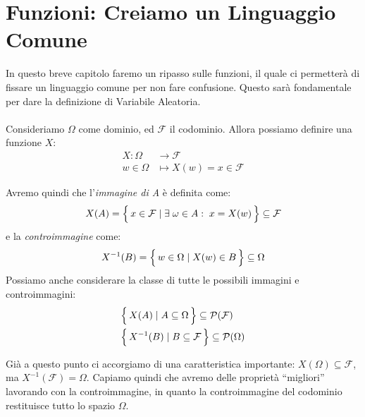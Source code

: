 \chapter{Funzioni: Creiamo un Linguaggio Comune}
In questo breve capitolo faremo un ripasso sulle funzioni, il quale ci permetterà di fissare un linguaggio comune per non fare confusione. Questo sarà fondamentale per dare la definizione di Variabile Aleatoria.\\
\\
Consideriamo $\Omega$ come dominio, ed $\mathcal{F}$ il codominio. Allora possiamo definire una funzione $X$:
\begin{align*}
    X:\Omega&\longrightarrow \mathcal{F}\\
    w\in\Omega &\longmapsto X(w) = x\in \mathcal{F}
\end{align*}
\begin{figure}[H]
    \centering
\end{figure}
\noindent Avremo quindi che l'\textit{immagine di A} è definita come:
\[
    X(A) = \Bigl\{\,x\in\mathcal{F}\mid \exists\;\omega\in A:\;x = X(w)\,\Bigr\}\subseteq\mathcal{F}
\]
e la \textit{controimmagine} come:
\[X^{-1}(B) = \Bigl\{\,w\in\Omega \mid X(w)\in B\,\Bigr\}\subseteq\Omega\]
Possiamo anche considerare la classe di tutte le possibili immagini e controimmagini:
\begin{align*}
    & \Bigl\{\,X(A) \mid A\subseteq\Omega\,\Bigr\}\subseteq \mathcal{P}(\mathcal{F})\\
    & \Bigl\{\,X^{-1}(B)\mid B\subseteq \mathcal{F}\,\Bigr\}\subseteq \mathcal{P}(\Omega)
\end{align*}

\noindent Già a questo punto ci accorgiamo di una caratteristica importante: $X(\Omega)\subseteq \mathcal{F}$, ma $X^{-1}(\mathcal{F}) = \Omega$. Capiamo quindi che avremo delle proprietà ``migliori'' lavorando con la controimmagine, in quanto la controimmagine del codominio restituisce tutto lo spazio $\Omega$.

